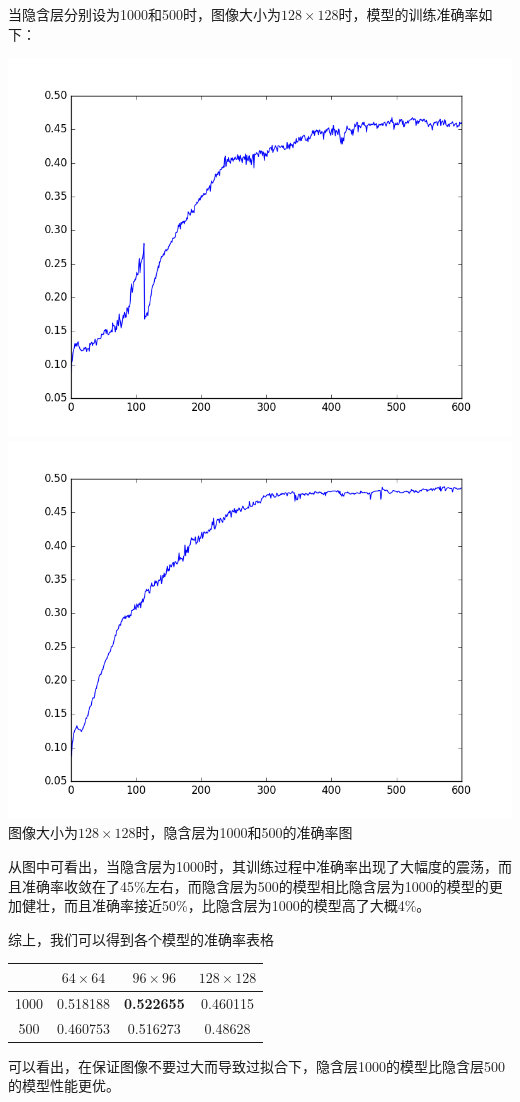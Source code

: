 当隐含层分别设为1000和500时，图像大小为$128\times 128$时，模型的训练准确率如下：
\begin{center}
\includegraphics[scale=0.4]{../figures/Log/BP_new3/BP_new3_acc.png} 
\includegraphics[scale=0.4]{../figures/Log/BP_new6/BP_new6_acc.png} \\
图像大小为$128\times 128$时，隐含层为1000和500的准确率图
\end{center}
从图中可看出，当隐含层为1000时，其训练过程中准确率出现了大幅度的震荡，而且准确率收敛在了45\%左右，而隐含层为500的模型相比隐含层为1000的模型的更加健壮，而且准确率接近50\%，比隐含层为1000的模型高了大概4\%。

综上，我们可以得到各个模型的准确率表格
\begin{center}
\begin{tabular}{cccc}
\toprule[2pt]
\  & $64\times 64$ & $96\times 96$ & $128\times 128$ \\ 
\midrule[1pt]
1000 & 0.518188 & \textbf{0.522655} & 0.460115 \\ 
500 & 0.460753 & 0.516273 & 0.48628 \\ 
\bottomrule[2pt]
\end{tabular} 
\end{center}
可以看出，在保证图像不要过大而导致过拟合下，隐含层1000的模型比隐含层500的模型性能更优。

